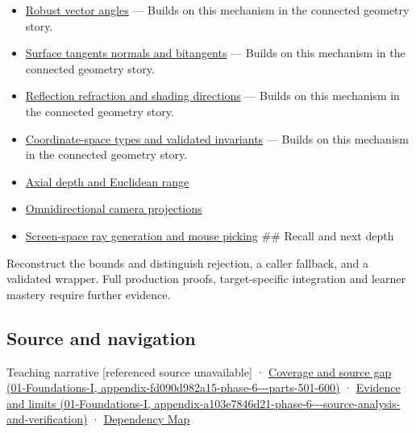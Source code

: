 \begin{itemize}
\item
  \hyperref[appendix-e569e60e18e6]{Robust vector angles} --- Builds on this mechanism in the connected geometry story.
\item
  \hyperref[appendix-e31893dec985]{Surface tangents normals and bitangents} --- Builds on this mechanism in the connected geometry story.
\item
  \hyperref[appendix-44e00863b4d5]{Reflection refraction and shading directions} --- Builds on this mechanism in the connected geometry story.
\item
  \hyperref[appendix-380a220e2529]{Coordinate-space types and validated invariants} --- Builds on this mechanism in the connected geometry story.
\item
  \hyperref[appendix-cac01ebeeb11]{Axial depth and Euclidean range}
\item
  \hyperref[appendix-fc99ad39f351]{Omnidirectional camera projections}
\item
  \hyperref[appendix-f1a6d43e80d1]{Screen-space ray generation and mouse picking} \#\# Recall and next depth
\end{itemize}

Reconstruct the bounds and distinguish rejection, a caller fallback, and a validated wrapper. Full production proofs, target-specific integration and learner mastery require further evidence.

\subsection{Source and navigation}\label{appendix-f744e41b95b4-source-and-navigation}

{Teaching narrative {[}referenced source unavailable{]}} · \href{../01-Foundations-I/main.pdf\#nameddest=appendix-fd090d982a15-phase-6---parts-501-600}{Coverage and source gap (01-Foundations-I, appendix-fd090d982a15-phase-6-\/-\/-parts-501-600)} · \href{../01-Foundations-I/main.pdf\#nameddest=appendix-a103e7846d21-phase-6---source-analysis-and-verification}{Evidence and limits (01-Foundations-I, appendix-a103e7846d21-phase-6-\/-\/-source-analysis-and-verification)} · \hyperref[appendix-4ad47bdd269a]{Dependency Map}
